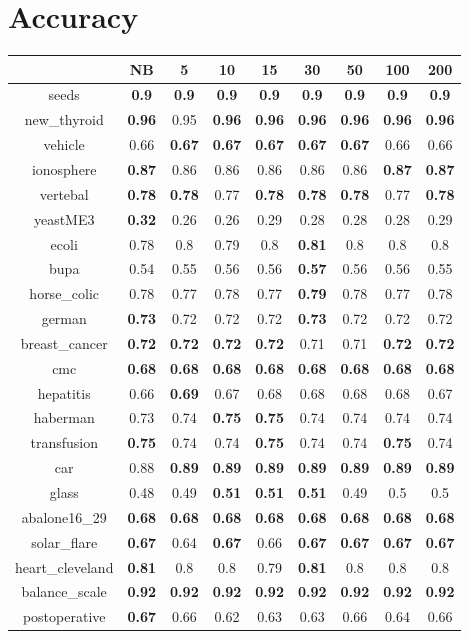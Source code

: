 \documentclass{article}%
\begin{document}
%
\normalsize%
\section*{Accuracy}%
\begin{tabular}{c|cccccccc}%
\hline%
&NB&5&10&15&30&50&100&200\\%
\hline%
seeds&\textbf{0.9}&\textbf{0.9}&\textbf{0.9}&\textbf{0.9}&\textbf{0.9}&\textbf{0.9}&\textbf{0.9}&\textbf{0.9}\\%
new\_thyroid&\textbf{0.96}&0.95&\textbf{0.96}&\textbf{0.96}&\textbf{0.96}&\textbf{0.96}&\textbf{0.96}&\textbf{0.96}\\%
vehicle&0.66&\textbf{0.67}&\textbf{0.67}&\textbf{0.67}&\textbf{0.67}&\textbf{0.67}&0.66&0.66\\%
ionosphere&\textbf{0.87}&0.86&0.86&0.86&0.86&0.86&\textbf{0.87}&\textbf{0.87}\\%
vertebal&\textbf{0.78}&\textbf{0.78}&0.77&\textbf{0.78}&\textbf{0.78}&\textbf{0.78}&0.77&\textbf{0.78}\\%
yeastME3&\textbf{0.32}&0.26&0.26&0.29&0.28&0.28&0.28&0.29\\%
ecoli&0.78&0.8&0.79&0.8&\textbf{0.81}&0.8&0.8&0.8\\%
bupa&0.54&0.55&0.56&0.56&\textbf{0.57}&0.56&0.56&0.55\\%
horse\_colic&0.78&0.77&0.78&0.77&\textbf{0.79}&0.78&0.77&0.78\\%
german&\textbf{0.73}&0.72&0.72&0.72&\textbf{0.73}&0.72&0.72&0.72\\%
breast\_cancer&\textbf{0.72}&\textbf{0.72}&\textbf{0.72}&\textbf{0.72}&0.71&0.71&\textbf{0.72}&\textbf{0.72}\\%
cmc&\textbf{0.68}&\textbf{0.68}&\textbf{0.68}&\textbf{0.68}&\textbf{0.68}&\textbf{0.68}&\textbf{0.68}&\textbf{0.68}\\%
hepatitis&0.66&\textbf{0.69}&0.67&0.68&0.68&0.68&0.68&0.67\\%
haberman&0.73&0.74&\textbf{0.75}&\textbf{0.75}&0.74&0.74&0.74&0.74\\%
transfusion&\textbf{0.75}&0.74&0.74&\textbf{0.75}&0.74&0.74&\textbf{0.75}&0.74\\%
car&0.88&\textbf{0.89}&\textbf{0.89}&\textbf{0.89}&\textbf{0.89}&\textbf{0.89}&\textbf{0.89}&\textbf{0.89}\\%
glass&0.48&0.49&\textbf{0.51}&\textbf{0.51}&\textbf{0.51}&0.49&0.5&0.5\\%
abalone16\_29&\textbf{0.68}&\textbf{0.68}&\textbf{0.68}&\textbf{0.68}&\textbf{0.68}&\textbf{0.68}&\textbf{0.68}&\textbf{0.68}\\%
solar\_flare&\textbf{0.67}&0.64&\textbf{0.67}&0.66&\textbf{0.67}&\textbf{0.67}&\textbf{0.67}&\textbf{0.67}\\%
heart\_cleveland&\textbf{0.81}&0.8&0.8&0.79&\textbf{0.81}&0.8&0.8&0.8\\%
balance\_scale&\textbf{0.92}&\textbf{0.92}&\textbf{0.92}&\textbf{0.92}&\textbf{0.92}&\textbf{0.92}&\textbf{0.92}&\textbf{0.92}\\%
postoperative&\textbf{0.67}&0.66&0.62&0.63&0.63&0.66&0.64&0.66\\%
\end{tabular}
\end{document}
